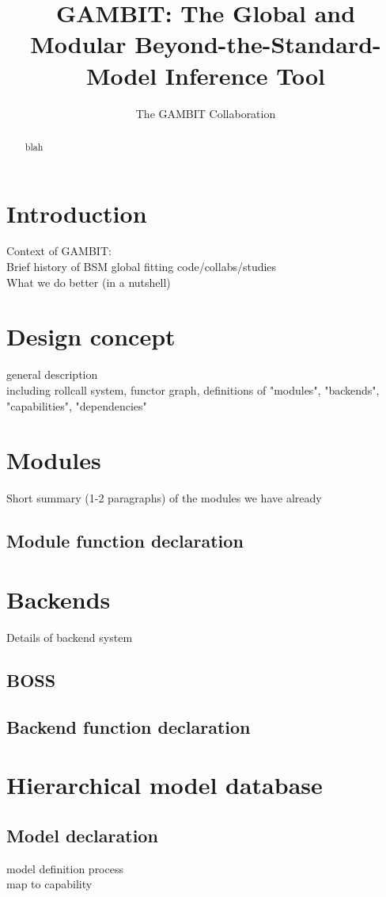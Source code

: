 \documentclass[11pt,a4paper]{article}
\title{GAMBIT: The Global and Modular Beyond-the-Standard-Model Inference Tool}
\author{The GAMBIT Collaboration}
\begin{document}
\maketitle

\begin{abstract}
blah
\end{abstract}

\section{Introduction}
Context of GAMBIT:\\
Brief history of BSM global fitting code/collabs/studies\\
What we do better (in a nutshell)

\section{Design concept}
general description\\
including rollcall system, functor graph, definitions of "modules", "backends", "capabilities", "dependencies"

\section{Modules}
Short summary (1-2 paragraphs) of the modules we have already
\subsection{Module function declaration}

\section{Backends}
Details of backend system
\subsection{BOSS}
\subsection{Backend function declaration}

\section{Hierarchical model database}
\subsection{Model declaration}
model definition process\\
map to capability
\end{document}
